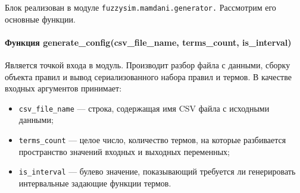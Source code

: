 Блок реализован в модуле  \lstinline!fuzzysim.mamdani.generator.! Рассмотрим его основные функции.

\paragraph{Функция generate\_config(csv\_file\_name, terms\_count, is\_interval)}

Является точкой входа в модуль. Производит разбор файла с данными, сборку объекта правил и вывод сериализованного набора правил и термов. В качестве входных аргументов принимает:

\begin{itemize}
	\item \lstinline!csv_file_name! — строка, содержащая имя CSV файла с исходными данными;
	\item \lstinline!terms_count! — целое число, количество термов, на которые разбивается пространство значений входных и выходных переменных;
	\item \lstinline!is_interval! — булево значение, показывающий требуется ли генерировать интервальные задающие функции термов.
\end{itemize}

